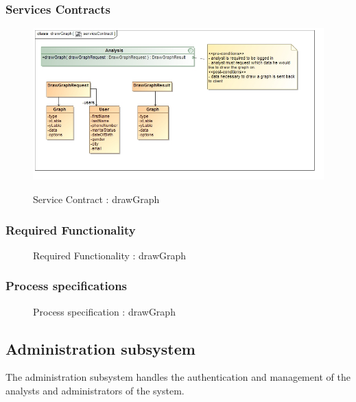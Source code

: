 \documentclass{article}
\begin{document}
		\subsubsection{Services Contracts}

		\begin{figure}[H]
		\includegraphics[width=\textwidth]{images/class__drawGraph__serviceContract.jpg}  \\
		\caption{Service Contract : drawGraph}
		\end{figure}

		\subsubsection{Required Functionality}

		\begin{figure}[H]
		\caption{Required Functionality : drawGraph}
		\end{figure}

		\subsubsection{Process specifications}

		\begin{figure}[H]
		\caption{Process specification : drawGraph}
		\end{figure}
	\pagebreak
	\subsection{Administration subsystem}\label{subsec:Admin}
	The administration subsystem handles the authentication and management of the analysts and administrators of the system.
\end{document}
